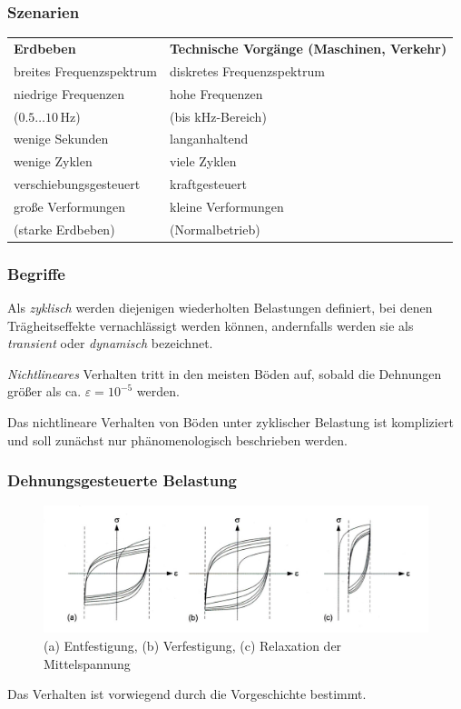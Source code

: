 \documentclass[hyperref={pdfpagemode=FullScreen, colorlinks=false}]{beamer}
\begin{document}
\begin{frame}
\frametitle{Szenarien}

\begin{tabular}{ll} 
\textbf{Erdbeben} & \textbf{Technische Vorgänge (Maschinen, Verkehr)} \\[2mm] 
breites Frequenzspektrum  & diskretes Frequenzspektrum  \\[1mm] 
niedrige Frequenzen& hohe Frequenzen\\
($0.5 \dots 10$\,Hz)  & (bis kHz-Bereich) \\[1mm] 
wenige Sekunden  & langanhaltend \\[1mm] 
wenige Zyklen & viele Zyklen \\[1mm] 
verschiebungsgesteuert & kraftgesteuert \\[1mm] 
große Verformungen& kleine Verformungen\\
(starke Erdbeben) & (Normalbetrieb) 
\end{tabular}

\end{frame}

\begin{frame}
\frametitle{Begriffe}
Als \textsl{zyklisch} werden diejenigen wiederholten Belastungen definiert, 
bei denen Trägheitseffekte vernachlässigt werden können, andernfalls werden sie als
\textsl{transient} oder \textsl{dynamisch} bezeichnet.

\bigskip

\textsl{Nichtlineares} Verhalten tritt in den meisten Böden auf, 
sobald die Dehnungen größer als ca. $\varepsilon=10^{-5}$ werden. 

\bigskip

Das nichtlineare Verhalten von Böden unter zyklischer Belastung ist kompliziert 
und soll zunächst nur phänomenologisch beschrieben werden.
\end{frame}

\begin{frame}
\frametitle{Dehnungsgesteuerte Belastung}
\begin{figure}
\includegraphics[width=\linewidth]{fig_img/bild14abc.jpg}
\caption*{(a) Entfestigung, (b) Verfestigung, (c) Relaxation der Mittelspannung \cite{Vrettos2017}} 
\end{figure}
Das Verhalten ist vorwiegend durch die Vorgeschichte bestimmt.
\end{frame}
\end{document}
